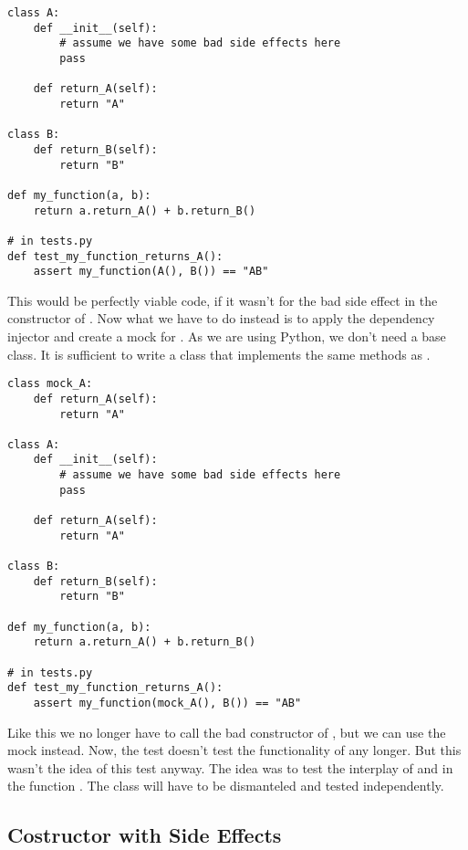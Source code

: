 \begin{programcode}{}
\begin{verbatim}
class A:
    def __init__(self):
        # assume we have some bad side effects here
        pass

    def return_A(self):
        return "A"
    
class B:
    def return_B(self):
        return "B"

def my_function(a, b):
    return a.return_A() + b.return_B()

# in tests.py
def test_my_function_returns_A():
    assert my_function(A(), B()) == "AB"
\end{verbatim}
\end{programcode}

This would be perfectly viable code, if it wasn't for the bad side effect in the constructor of . Now what we have to do instead is to apply the dependency injector and create a mock for . As we are using Python, we don't need a base class. It is sufficient to write a class that implements the same methods as .

\begin{programcode}{}
\begin{verbatim}
class mock_A:
    def return_A(self):
        return "A"

class A:
    def __init__(self):
        # assume we have some bad side effects here
        pass

    def return_A(self):
        return "A"
   
class B:
    def return_B(self):
        return "B"

def my_function(a, b):
    return a.return_A() + b.return_B()

# in tests.py
def test_my_function_returns_A():
    assert my_function(mock_A(), B()) == "AB"
\end{verbatim}
\end{programcode}

Like this we no longer have to call the bad constructor of , but we can use the mock instead. Now, the test doesn't test the functionality of  any longer. But this wasn't the idea of this test anyway. The idea was to test the interplay of  and  in the function . The class  will have to be dismanteled and tested independently.


\subsection{Costructor with Side Effects}


